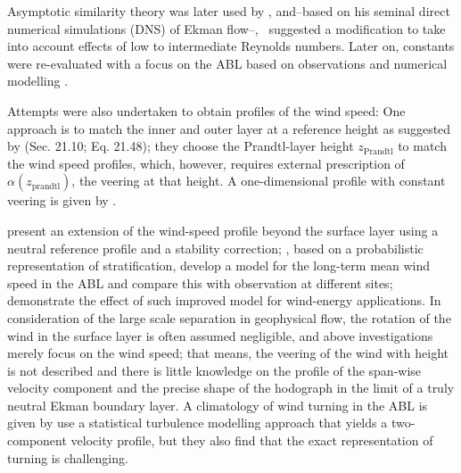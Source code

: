 \documentclass[smallcondensed,final]{svjour3}
\begin{document}
%
Asymptotic similarity theory was later used by \cite{tennekes:JAS1973, blackadar:JAS1968},
and--based on his seminal direct numerical simulations (DNS) of Ekman flow--,~\cite{spalart:JFM1989} suggested
a modification to take into account effects of low to intermediate Reynolds numbers.
Later on, constants were re-evaluated with a focus on the ABL based on
observations \citep{hogstrom:BM1988,hogstrom:BM1996}
and numerical modelling \citep{spalart:PF2008, spalart:PF2009, ansorge:BM2014, ansorge:BM2019}.
%
\par
%
Attempts were also undertaken to obtain profiles of the wind speed: 
One approach is to match the inner and outer layer at a reference height as suggested by
\cite{etling:2002, emeis:2018}  (Sec. 21.10; Eq. 21.48); they choose the Prandtl-layer height $z_\text{Prandtl}$ to match
the wind speed profiles, which, however, requires external prescription of $\alpha(z_\text{prandtl})$, the veering at that height. 
A one-dimensional profile with constant veering is given by \citet[Sec. 3; Eq. 3.1-3.19]{emeis:m2007}. 

\citet{gryning:BM2007} present an extension of the wind-speed profile beyond the surface layer
using a neutral reference profile and a stability correction;
\cite{kelly:BM2010}, based on a probabilistic representation of stratification,
develop a model for the long-term mean wind speed
in the ABL and compare this with observation at different sites; 
\cite{kelly:WE2016} demonstrate the effect of such improved model for wind-energy applications.
%
In consideration of the large scale separation in geophysical flow, the rotation of the wind in the
surface layer is often assumed negligible, and above investigations merely focus on the wind speed; 
that means, the veering of the wind with height is not described and there is little knowledge on the
profile of the span-wise velocity component and the precise shape of the hodograph in the limit of a
truly neutral Ekman boundary layer.
%
A climatology of wind turning in the ABL is given by \cite{lindvall:QJR2019} 
%
\cite{klein:PAM2021a} use a statistical turbulence modelling approach that yields a two-component velocity profile,
but they also find that the exact representation of turning is challenging.
\end{document}
